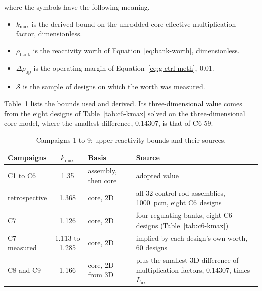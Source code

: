 \noindent where the symbols have the following meaning.

\begin{itemize}
  \item $k_{\max}$ is the derived bound on the unrodded core effective multiplication factor, dimensionless.

  \item $\rho_\mathrm{bank}$ is the reactivity worth of
        Equation~\eqref{eq:bank-worth}, dimensionless.

  \item $\Delta\rho_\mathrm{op}$ is the operating margin of
        Equation~\eqref{eq:g-ctrl-meth}, \num{0.01}.

  \item $\mathcal{S}$ is the sample of designs on which the worth was
        measured.
\end{itemize}

Table~\ref{tab:ctrl-bounds} lists the bounds used and derived. Its
three-dimensional value comes from the eight designs of
Table~\ref{tab:c6-kmax} solved on the three-dimensional core model, where
the smallest difference, 0.14307, is that of C6-59.

\begin{table}[htbp]
  \centering
  \caption{Campaigns 1 to 9: upper reactivity bounds and their sources.}
  \label{tab:ctrl-bounds}
  \small
  \begin{tabularx}{\textwidth}{@{}>{\raggedright\arraybackslash}p{}c>{\raggedright\arraybackslash}p{}>{\raggedright\arraybackslash}X@{}}
    \toprule
    Campaigns & $k_{\max}$ & Basis & Source \\
    \midrule
    C1 to C6 & 1.35  & assembly, then core & adopted value \\
    retrospective & 1.368 & core, 2D & all 32 control rod assemblies, \SI{1000}{pcm}, eight C6 designs \\
    C7 & 1.126 & core, 2D & four regulating banks, eight C6 designs (Table~\ref{tab:c6-kmax}) \\
    C7 measured & 1.113 to 1.285 & core, 2D & implied by each design's own worth, 60 designs \\
    C8 and C9 & 1.166 & core, 2D from 3D & 0.99 plus the smallest 3D difference of multiplication factors, 0.14307, times $L_\mathrm{ax}$ \\
    \bottomrule
  \end{tabularx}
\end{table}

